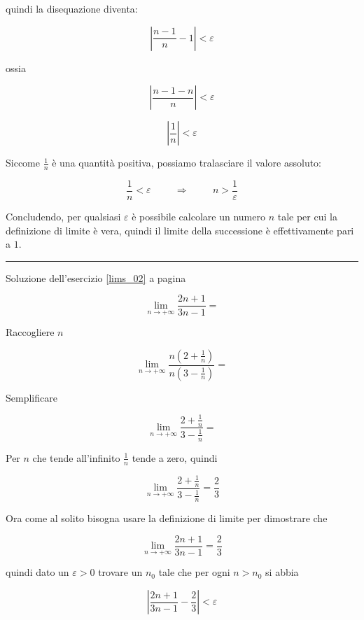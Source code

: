 quindi la disequazione diventa:

\[
\left| \frac{n-1}{n} -1 \right| < \varepsilon
\]

ossia

\[
\left| \frac{n-1-n}{n} \right| < \varepsilon
\]

\[
\left| \frac{1}{n} \right| < \varepsilon
\]

Siccome $\frac{1}{n}$ è una quantità positiva, possiamo tralasciare il valore assoluto:


\[
\frac{1}{n} < \varepsilon \hspace{1cm} \Rightarrow  \hspace{1cm} n > \frac{1}{\varepsilon}
\]

Concludendo, per qualsiasi $\varepsilon$ è possibile calcolare un numero $n$ tale per cui la definizione di limite è vera, quindi il limite della successione è effettivamente pari a $1$.



\vspace{1cm}
\hrule
\vspace{1cm}



Soluzione dell'esercizio \ref{lims_02} a pagina \pageref{lims_02}\label{limss_02}

\[
\lim_{n \to +\infty}\frac{2n+1}{3n-1}=
\]

Raccogliere $n$

\[
\lim_{n \to +\infty}\frac{n
\left( 
	2+\frac{1}{n}
\right)
}{n
\left( 
	3-\frac{1}{n}
\right)
}=
\]

Semplificare

\[
\lim_{n \to +\infty}\frac{
	2+\frac{1}{n}
}{
	3-\frac{1}{n}
}=
\]

Per $n$ che tende all'infinito $\frac{1}{n}$ tende a zero, quindi


\[
\lim_{n \to +\infty}\frac{
	2+\frac{1}{n}
}{
	3-\frac{1}{n}
}=\frac{2}{3}
\]

Ora come al solito bisogna usare la definizione di limite per dimostrare che 

\[
\lim_{n \to +\infty}\frac{2n+1}{3n-1}=\frac{2}{3}
\]

quindi dato un $\varepsilon > 0$ trovare un $n_0$ tale che per ogni $n>n_0$ si abbia

\[
\left|
\frac{2n+1}{3n-1}-\frac{2}{3}
\right| < \varepsilon
\]


